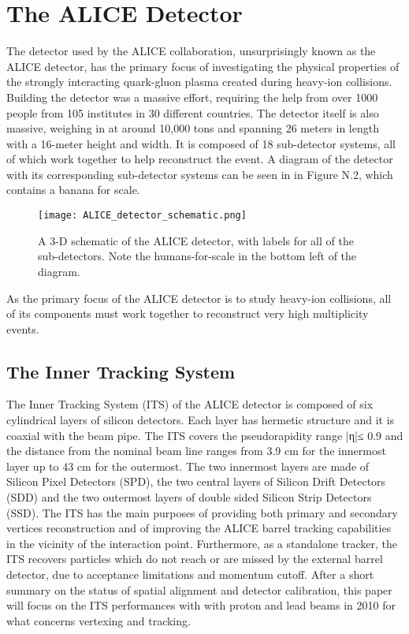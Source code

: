 \section{The ALICE Detector}
The detector used by the ALICE collaboration, unsurprisingly known as the ALICE detector, has the primary focus of investigating the physical properties of the strongly interacting quark-gluon plasma created during heavy-ion collisions.
Building the detector was a massive effort, requiring the help from over 1000 people from 105 institutes in 30 different countries. 
The detector itself is also massive, weighing in at around 10,000 tons and spanning 26 meters in length with a 16-meter height and width.
It is composed of 18 sub-detector systems, all of which work together to help reconstruct the event.
A diagram of the detector with its corresponding sub-detector systems can be seen in in Figure N.2, which contains a banana for scale.
\begin{figure}
    \centering
    \texttt{[image: ALICE\_detector\_schematic.png]}
    \caption{A 3-D schematic of the ALICE detector, with labels for all of the sub-detectors. Note the humans-for-scale in the bottom left of the diagram.}
    \label{fig:my_label}
\end{figure}
As the primary focus of the ALICE detector is to study heavy-ion collisions, all of its components must work together to reconstruct very high multiplicity events. 

\subsection{The Inner Tracking System}
The Inner Tracking System (ITS) of the ALICE detector is composed of six cylindrical layers of silicon detectors.
Each layer has hermetic structure and it is coaxial with the beam pipe.
The ITS covers the pseudorapidity range |η|≤ 0.9 and the distance from the nominal beam line ranges from 3.9 cm for the innermost layer up to 43 cm for the outermost.
The two innermost layers are made of Silicon Pixel Detectors (SPD), the two central layers of Silicon Drift Detectors (SDD) and the two outermost layers of double sided Silicon Strip Detectors (SSD).
The ITS has the main purposes of providing both primary and secondary vertices reconstruction and of improving the ALICE barrel tracking capabilities in the vicinity of the interaction point.
Furthermore, as a standalone tracker, the ITS recovers particles which do not reach or are missed by the external barrel detector, due to acceptance limitations and momentum cutoff.
After a short summary on the status of spatial alignment and detector calibration, this paper will focus on the ITS performances with with proton and lead beams in 2010 for what concerns vertexing and tracking.
